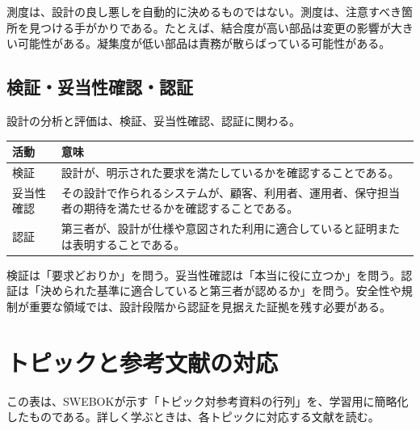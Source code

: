 \documentclass[10.5pt,a4paper]{ltjsarticle}
\begin{document}
測度は、設計の良し悪しを自動的に決めるものではない。測度は、注意すべき箇所を見つける手がかりである。たとえば、結合度が高い部品は変更の影響が大きい可能性がある。凝集度が低い部品は責務が散らばっている可能性がある。

\subsection{検証・妥当性確認・認証}

設計の分析と評価は、検証、妥当性確認、認証に関わる。

\begin{tabularx}{\linewidth}{L{32mm}Y}
\toprule
\textbf{活動} & \textbf{意味} \\
\midrule
検証 & 設計が、明示された要求を満たしているかを確認することである。 \\
妥当性確認 & その設計で作られるシステムが、顧客、利用者、運用者、保守担当者の期待を満たせるかを確認することである。 \\
認証 & 第三者が、設計が仕様や意図された利用に適合していると証明または表明することである。 \\
\bottomrule
\end{tabularx}

検証は「要求どおりか」を問う。妥当性確認は「本当に役に立つか」を問う。認証は「決められた基準に適合していると第三者が認めるか」を問う。安全性や規制が重要な領域では、設計段階から認証を見据えた証拠を残す必要がある。

\section{トピックと参考文献の対応}

この表は、SWEBOKが示す「トピック対参考資料の行列」を、学習用に簡略化したものである。詳しく学ぶときは、各トピックに対応する文献を読む。
\end{document}
